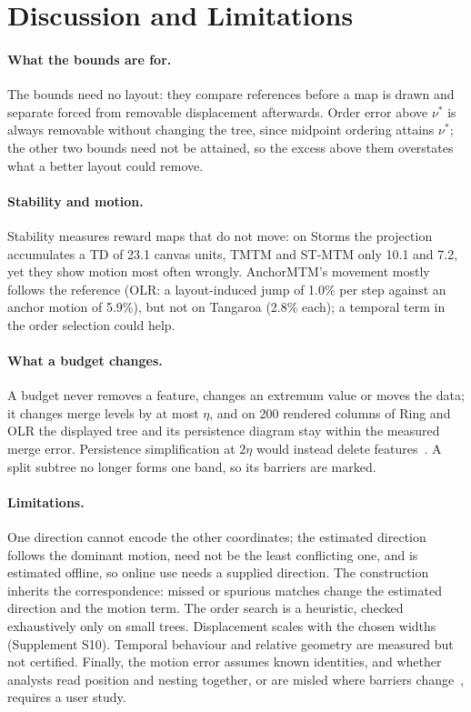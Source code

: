\documentclass[review]{vgtc}
\begin{document}
\section{Discussion and Limitations}\label{sec:discussion}
\paragraph{What the bounds are for.} The bounds need no layout: they compare references before a map is drawn and separate forced from removable displacement afterwards. Order error above $\nu^*$ is always removable without changing the tree, since midpoint ordering attains $\nu^*$; the other two bounds need not be attained, so the excess above them overstates what a better layout could remove.

\paragraph{Stability and motion.} Stability measures reward maps that do not move: on Storms the projection accumulates a TD of 23.1 canvas units, TMTM and ST-MTM only 10.1 and 7.2, yet they show motion most often wrongly. AnchorMTM's movement mostly follows the reference (OLR: a layout-induced jump of 1.0\% per step against an anchor motion of 5.9\%), but not on Tangaroa (2.8\% each); a temporal term in the order selection could help.

\paragraph{What a budget changes.} A budget never removes a feature, changes an extremum value or moves the data; it changes merge levels by at most $\eta$, and on 200 rendered columns of Ring and OLR the displayed tree and its persistence diagram stay within the measured merge error. Persistence simplification at $2\eta$ would instead delete features~\cite{Edelsbrunner:2002:TPS,Tierny:2012:GTS}. A split subtree no longer forms one band, so its barriers are marked.

\paragraph{Limitations.} One direction cannot encode the other coordinates; the estimated direction follows the dominant motion, need not be the least conflicting one, and is estimated offline, so online use needs a supplied direction. The construction inherits the correspondence: missed or spurious matches change the estimated direction and the motion term. The order search is a heuristic, checked exhaustively only on small trees. Displacement scales with the chosen widths (Supplement S10). Temporal behaviour and relative geometry are measured but not certified. Finally, the motion error assumes known identities, and whether analysts read position and nesting together, or are misled where barriers change~\cite{Kamakshidasan:2021:MM,McNutt:2020:SVM}, requires a user study.
\end{document}
